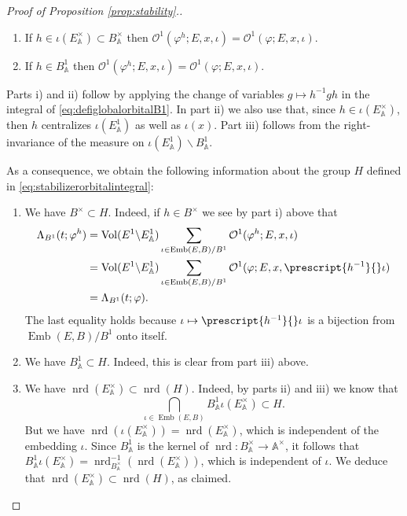 \documentclass{article}
\theoremstyle{named}
\newcommand{\A}{\mathbb{A}}
\renewcommand{\O}{\mathcal{O}}
\DeclareMathOperator{\vol}{Vol}
\DeclareMathOperator{\Emb}{Emb}
\DeclareMathOperator{\nrd}{nrd}
\begin{document}
\begin{proof}[Proof of Proposition \ref{prop:stability}.]
\begin{enumerate}
    \item [ii)] If $h \in \iota(E_\A^\times) \subset B_\A^\times$ then $\O^1(\varphi^h; E, x, \iota) = \O^1(\varphi; E, x, \iota)$.
    \item [iii)] If $h \in B^1_\A$ then $\O^1(\varphi^h; E, x, \iota) = \O^1(\varphi; E, x, \iota)$.
\end{enumerate}
Parts i) and ii) follow by applying the change of variables $g \mapsto h^{-1}gh$ in the integral of \eqref{eq:defiglobalorbitalB1}. In part ii) we also use that, since $h \in\iota(E_\A^\times)$, then $h$ centralizes $\iota(E_\A^1)$ as well as $\iota(x)$. Part iii) follows from the right-invariance of the measure on $\iota(E_\A^1)\backslash B_\A^1$.

As a consequence, we obtain the following information about the group $H$ defined in \eqref{eq:stabilizerorbitalintegral}:
\begin{enumerate}
    \item [a)] We have $B^\times \subset H$. Indeed, if $h \in B^\times$ we see by part i) above that  
\begin{equation*}
\begin{aligned}
    \Lambda_{B^1}(t; \varphi^h) & = \vol(E^1 \backslash E^1_\A) \sum_{\iota \in \Emb(E, B)/B^1} \O^1(\varphi^h; E, x, \iota)\\
& = \vol(E^1 \backslash E^1_\A) \sum_{\iota \in \Emb(E, B)/B^1} \O^1(\varphi; E, x, \prescript{h^{-1}}{}\iota)\\
& = \Lambda_{B^1}(t; \varphi).
\end{aligned}
\end{equation*}
The last equality holds because $\iota \mapsto \prescript{h^{-1}}{}\iota$ is a bijection from $\Emb(E, B)/B^1$ onto itself.
    \item [b)] We have $B_\A^1 \subset H$. Indeed, this is clear from part iii) above.
    \item [c)] We have $\nrd(E_\A^\times) \subset \nrd(H)$. Indeed, by parts ii) and iii) we know that 
    \begin{equation*}
        \bigcap_{\iota \in \Emb(E, B)} B_\A^1\iota(E_\A^\times) \subset H.
    \end{equation*}
    But we have $\nrd(\iota(E_\A^\times)) = \nrd(E_\A^\times)$, which is independent of the embedding $\iota$. Since $B_\A^1$ is the kernel of $\nrd: B_\A^\times \rightarrow \A^\times$, it follows that $B_\A^1 \iota(E_\A^\times) = \nrd_{B_\A^\times}^{-1}(\nrd(E_\A^\times))$, which is independent of $\iota$. We deduce that $\nrd(E_\A^\times) \subset \nrd(H)$, as claimed. 

\end{enumerate}
\end{proof}
\end{document}
